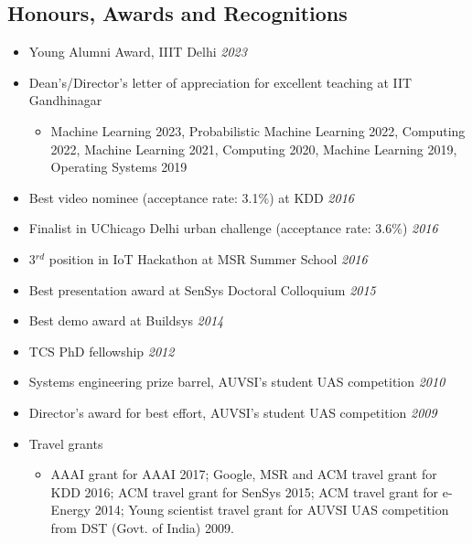 \documentclass[letter,10pt]{article}
\begin{document}
\subsection*{\sc \textbf{Honours, Awards and Recognitions}\hspace{5pt}\noindent\hrulefill}
\begin{itemize}
\item[]{Young Alumni Award, IIIT Delhi} \hfill\textit{2023}
    \item[] Dean's/Director's letter of appreciation for excellent teaching at IIT Gandhinagar
    \begin{itemize}
        \item[] Machine Learning 2023, Probabilistic Machine Learning 2022, Computing 2022, Machine Learning 2021, Computing 2020, Machine Learning 2019, Operating Systems 2019
    \end{itemize}
    \item[]{Best video nominee (acceptance rate: 3.1\%)} at KDD \hfill\textit{2016}
    \item[]{Finalist in UChicago Delhi urban challenge (acceptance rate: 3.6\%)} \hfill\textit{2016}
    \item[]{3$^{rd}$ position in IoT Hackathon at MSR Summer School} \hfill\textit{2016}
    
    \item[]{Best presentation award at SenSys Doctoral Colloquium} \hfill\textit{2015}
    \item[]{Best demo award at Buildsys} \hfill\textit{2014}
    \item[]{TCS PhD fellowship} \hfill\textit{2012}
    \item[]{Systems engineering prize barrel, AUVSI's student UAS competition} \hfill\textit{2010}
    \item[]{Director's award for best effort, AUVSI's student UAS competition} \hfill\textit{2009}

    \item[] Travel grants
    \begin{itemize}
        \item[] AAAI grant for AAAI 2017; Google, MSR and ACM travel grant for KDD 2016; ACM travel grant for SenSys 2015; ACM travel grant for e-Energy 2014; Young scientist travel grant for AUVSI UAS competition from DST (Govt. of India) 2009.
    \end{itemize}
   
    
\end{itemize}
\end{document}
